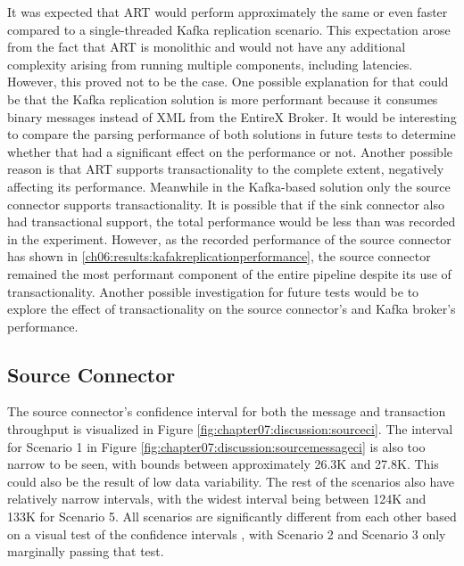 It was expected that \ac{ART} would perform approximately the same or even faster compared to a single-threaded Kafka replication scenario. This expectation arose from the fact that \ac{ART} is monolithic and would not have any additional complexity arising from running multiple components, including latencies. However, this proved not to be the case. One possible explanation for that could be that the Kafka replication solution is more performant because it consumes binary messages instead of XML from the EntireX Broker. It would be interesting to compare the parsing performance of both solutions in future tests to determine whether that had a significant effect on the performance or not. Another possible reason is that \ac{ART} supports transactionality to the complete extent, negatively affecting its performance. Meanwhile in the Kafka-based solution only the source connector supports transactionality. It is possible that if the sink connector also had transactional support, the total performance would be less than was recorded in the experiment. However, as the recorded performance of the source connector has shown in \ref{ch06:results:kafakreplicationperformance}, the source connector remained the most performant component of the entire pipeline despite its use of transactionality. Another possible investigation for future tests would be to explore the effect of transactionality on the source connector's and Kafka broker's performance.

\subsection{Source Connector}
The source connector's confidence interval for both the message and transaction throughput is visualized in Figure \ref{fig:chapter07:discussion:sourceci}. The interval for Scenario 1 in Figure \ref{fig:chapter07:discussion:sourcemessageci} is also too narrow to be seen, with bounds between approximately 26.3K and 27.8K. This could also be the result of low data variability. The rest of the scenarios also have relatively narrow intervals, with the widest interval being between 124K and 133K for Scenario 5. All scenarios are significantly different from each other based on a visual test of the confidence intervals \cite{jain1991computer}, with Scenario 2 and Scenario 3 only marginally passing that test.


